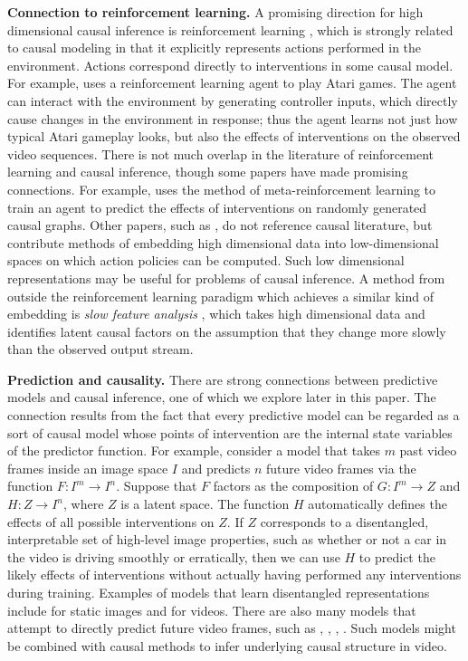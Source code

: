 \documentclass[letterpaper]{article} %
\begin{document}
\noindent \textbf{Connection to reinforcement learning.} A promising direction for high dimensional causal inference is reinforcement learning \cite{sutton2018reinforcement}, which is strongly related to causal modeling in that it explicitly represents actions performed in the environment. Actions correspond directly to interventions in some causal model. For example, \cite{oh2015action} uses a reinforcement learning agent to play Atari games. The agent can interact with the environment by generating controller inputs, which directly cause changes in the environment in response; thus the agent learns not just how typical Atari gameplay looks, but also the effects of interventions on the observed video sequences. There is not much overlap in the literature of reinforcement learning and causal inference, though some papers have made promising connections. For example, \cite{dasgupta2019causal} uses the method of meta-reinforcement learning to train an agent to predict the effects of interventions on randomly generated causal graphs. Other papers, such as \cite{lange2012autonomous}, do not reference causal literature, but contribute methods of embedding high dimensional data into low-dimensional spaces on which action policies can be computed. Such low dimensional representations may be useful for problems of causal inference. A method from outside the reinforcement learning paradigm which achieves a similar kind of embedding is \emph{slow feature analysis} \cite{kompella2011incremental}, which takes high dimensional data and identifies latent causal factors on the assumption that they change more slowly than the observed output stream.

\noindent \textbf{Prediction and causality.} There are strong connections between predictive models and causal inference, one of which we explore later in this paper. The connection results from the fact that every predictive model can be regarded as a sort of causal model whose points of intervention are the internal state variables of the predictor function. For example, consider a model that takes $m$ past video frames inside an image space $I$ and predicts $n$ future video frames via the function $F: I^m \rightarrow I^n$. Suppose that $F$ factors as the composition of $G: I^m \rightarrow Z$ and $H: Z \rightarrow I^n$, where $Z$ is a latent space. The function $H$ automatically defines the effects of all possible interventions on $Z$. If $Z$ corresponds to a disentangled, interpretable set of high-level image properties, such as whether or not a car in the video is driving smoothly or erratically, then we can use $H$ to predict the likely effects of interventions without actually having performed any interventions during training. Examples of models that learn disentangled representations include \cite{chen2016infogan} for static images and \cite{denton2017unsupervised} for videos. There are also many models that attempt to directly predict future video frames, such as \cite{babaeizadeh2017stochastic}, \cite{lotter2016deep}, \cite{finn2016unsupervised}, \cite{walker2014patch}. Such models might be combined with causal methods to infer underlying causal structure in video.
\end{document}
